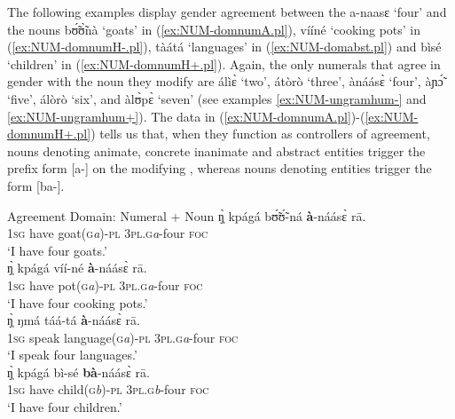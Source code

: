 \begin{exe}
\begin{exe}
\begin{exe}
\begin{exe}
\begin{exe}
\begin{exe}
\begin{exe}
\begin{exe}
\begin{exe}
\begin{exe}
\begin{table}
\end{table} 

The following examples display gender agreement between the  {\sls a-naasɛ} `four' and the nouns {\sls bʊ̃́ʊ̃̀nà}  `goats' in (\ref{ex:NUM-domnumA.pl}), {\sls vííné} `cooking pots' in (\ref{ex:NUM-domnumH-.pl}), {\sls tàátá} `languages' in (\ref{ex:NUM-domabst.pl}) and {\sls bìsé} `children'  in (\ref{ex:NUM-domnumH+.pl}). Again, the only numerals that agree in gender with the noun they modify are {\sls álìɛ̀} `two', {\sls átòrò}  `three', {\sls ànáásɛ̀} `four', {\sls àɲɔ̃́} `five', {\sls álòrò}  `six',  and   {\sls àlʊ̀pɛ̀} `seven' (see examples \ref{ex:NUM-ungramhum-} and \ref{ex:NUM-ungramhum+}). The data in (\ref{ex:NUM-domnumA.pl})-(\ref{ex:NUM-domnumH+.pl}) tells us that, when they function as controllers of agreement, nouns denoting  animate, concrete inanimate and abstract entities  trigger the prefix form [{\sls a-}] on the modifying ,  whereas nouns denoting  entities trigger the form [{\sls ba-}]. 

  \ea\label{ex:NUM-domnum}{\rm Agreement Domain: Numeral + Noun}
\ea\label{ex:NUM-domnumA.pl}
\gll   ŋ̩̀  kpágá   bʊ̃́ʊ̃́-ná {\bf à}-náásɛ̀ rā.\\
    \textsc{1sg}  {have}  {goat(\textsc{g}\textit{a})-\textsc{pl}} 
{\textsc{3pl.g}\textit{a}-four}  \textsc{foc}  \\
\glt `I have four goats.'\\


\ex\label{ex:NUM-domnumH-.pl}
\gll     ŋ̩̀  kpágá víí-né {\bf à}-náásɛ̀ rā.\\
  \textsc{1sg}  {have}  {pot(\textsc{g}\textit{a})-\textsc{pl}}  
{\textsc{3pl.g}\textit{a}-four}   \textsc{foc}  \\
\glt `I have four cooking pots.'\\


\ex\label{ex:NUM-domabst.pl}
\gll  ŋ̩̀ ŋmá  táá-tá {\bf à}-náásɛ̀ rā.\\
  \textsc{1sg}  {speak}  {language(\textsc{g}\textit{a})-\textsc{pl}}  
{\textsc{3pl.g}\textit{a}-four}   \textsc{foc}  \\
\glt `I speak four languages.'\\


\ex\label{ex:NUM-domnumH+.pl}
\gll   ŋ̩̀  kpágá bì-sé  {\bf bà}-náásɛ̀ rā.\\
  \textsc{1sg}  {have}  {child(\textsc{g}\textit{b})-\textsc{pl}}  
{\textsc{3pl.g}\textit{b}-four}  \textsc{foc}  \\
\glt `I have four children.'\\


\end{exe}
\end{exe}
\end{exe}
\end{exe}
\end{exe}
\end{exe}
\end{exe}
\end{exe}
\end{exe}
\end{exe}
